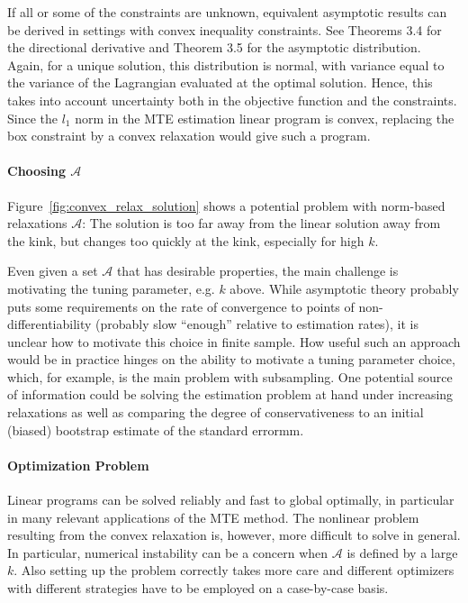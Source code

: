 \documentclass[12pt,a4paper,english]{article} %
\numberwithin{equation}{section}
\theoremstyle{definition}
\theoremstyle{remark}
\theoremstyle{plain}
\begin{document}
If all or some of the constraints are unknown, equivalent asymptotic results can be derived in settings with convex inequality constraints.
See Theorems 3.4 for the directional derivative and Theorem 3.5 for the asymptotic distribution.
Again, for a unique solution, this distribution is normal, with variance equal to the variance of the Lagrangian evaluated at the optimal solution.
Hence, this takes into account uncertainty both in the objective function and the constraints.
Since the $l_1$ norm in the MTE estimation linear program is convex, replacing the box constraint by a convex relaxation would give such a program.

\paragraph{Choosing $\mathcal{A}$}
Figure~\ref{fig:convex_relax_solution} shows a potential problem with norm-based relaxations $\mathcal{A}$:
The solution is too far away from the linear solution away from the kink, but changes too quickly at the kink, especially for high $k$.

Even given a set $\mathcal{A}$ that has desirable properties, the main challenge is motivating the tuning parameter, e.g. $k$ above.
While asymptotic theory probably puts some requirements on the rate of convergence to points of non-differentiability (probably slow ``enough'' relative to estimation rates), it is unclear how to motivate this choice in finite sample.
How useful such an approach would be in practice hinges on the ability to motivate a tuning parameter choice, which, for example, is the main problem with subsampling.
One potential source of information could be solving the estimation problem at hand under increasing relaxations as well as comparing the degree of conservativeness to an initial (biased) bootstrap estimate of the standard errormm.

\paragraph{Optimization Problem}
Linear programs can be solved reliably and fast to global optimally, in particular in many relevant applications of the MTE method.
The nonlinear problem resulting from the convex relaxation is, however, more difficult to solve in general.
In particular, numerical instability can be a concern when $\mathcal{A}$ is defined by a large $k$.
Also setting up the problem correctly takes more care and different optimizers with different strategies have to be employed on a case-by-case basis.
\end{document}
